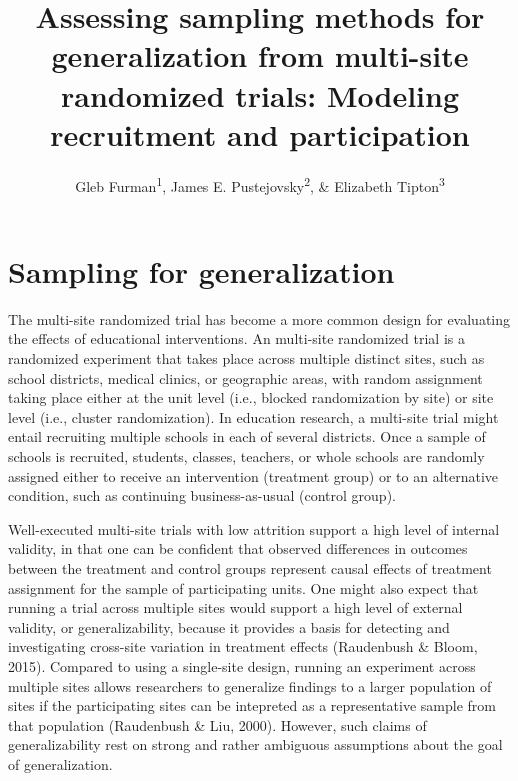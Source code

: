 \documentclass[
  english,
  man,floatsintext]{apa6}
\title{Assessing sampling methods for generalization from multi-site randomized trials: Modeling recruitment and participation}
\author{Gleb Furman\textsuperscript{1}, James E. Pustejovsky\textsuperscript{2}, \& Elizabeth Tipton\textsuperscript{3}}
\date{}
\affiliation{\vspace{0.5cm}\textsuperscript{1} University of Texas at Austin\\\textsuperscript{2} University of Wisconsin-Madison\\\textsuperscript{3} Northwestern University}
\begin{document}
\maketitle

\hypertarget{sampling-for-generalization}{%
\section*{Sampling for generalization}\label{sampling-for-generalization}}

The multi-site randomized trial has become a more common design for evaluating the effects of educational interventions. An multi-site randomized trial is a randomized experiment that takes place across multiple distinct sites, such as school districts, medical clinics, or geographic areas, with random assignment taking place either at the unit level (i.e., blocked randomization by site) or site level (i.e., cluster randomization). In education research, a multi-site trial might entail recruiting multiple schools in each of several districts. Once a sample of schools is recruited, students, classes, teachers, or whole schools are randomly assigned either to receive an intervention (treatment group) or to an alternative condition, such as continuing business-as-usual (control group).

Well-executed multi-site trials with low attrition support a high level of internal validity, in that one can be confident that observed differences in outcomes between the treatment and control groups represent causal effects of treatment assignment for the sample of participating units. One might also expect that running a trial across multiple sites would support a high level of external validity, or generalizability, because it provides a basis for detecting and investigating cross-site variation in treatment effects (Raudenbush \& Bloom, 2015). Compared to using a single-site design, running an experiment across multiple sites allows researchers to generalize findings to a larger population of sites if the participating sites can be intepreted as a representative sample from that population (Raudenbush \& Liu, 2000). However, such claims of generalizability rest on strong and rather ambiguous assumptions about the goal of generalization.
\end{document}
